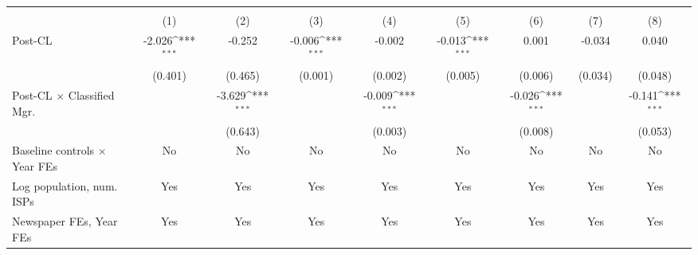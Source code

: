 {
\def\sym#1{\ifmmode^{#1}\else\(^{#1}\)\fi}
\begin{tabular}{l*{8}{c}}
\toprule
                    &&&&\\\cmidrule(lr){2-3}\cmidrule(lr){4-5}\cmidrule(lr){6-7}\cmidrule(lr){8-9}
                    &         &         &         &         &         &         &         &         \\
\midrule
Post-CL             &      -2.026\sym{***}&      -0.252         &      -0.006\sym{***}&      -0.002         &      -0.013\sym{***}&       0.001         &      -0.034         &       0.040         \\
                    &     (0.401)         &     (0.465)         &     (0.001)         &     (0.002)         &     (0.005)         &     (0.006)         &     (0.034)         &     (0.048)         \\
\addlinespace
Post-CL $\times$ Classified Mgr.&                     &      -3.629\sym{***}&                     &      -0.009\sym{***}&                     &      -0.026\sym{***}&                     &      -0.141\sym{***}\\
                    &                     &     (0.643)         &                     &     (0.003)         &                     &     (0.008)         &                     &     (0.053)         \\
\addlinespace
Baseline controls $\times$ Year FEs &          No         &          No         &          No         &          No         &          No         &          No         &          No         &          No         \\
\addlinespace
Log population, num. ISPs &         Yes         &         Yes         &         Yes         &         Yes         &         Yes         &         Yes         &         Yes         &         Yes         \\
\addlinespace
Newspaper FEs, Year FEs &         Yes         &         Yes         &         Yes         &         Yes         &         Yes         &         Yes         &         Yes         &         Yes         \\

\end{tabular}}
